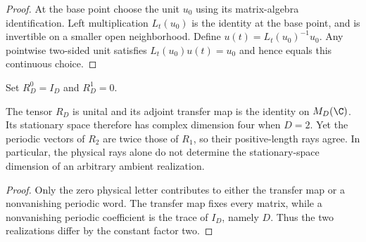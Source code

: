 \begin{proof}\leanok
    At the base point choose the unit $u_0$ using its matrix-algebra
    identification. Left multiplication $L_t(u_0)$ is the identity at
    the base point, and is invertible on a smaller open neighborhood.
    Define $u(t)=L_t(u_0)^{-1}u_0$. Any pointwise two-sided unit satisfies
    $L_t(u_0)u(t)=u_0$ and hence equals this continuous choice.
\end{proof}

\begin{definition}
    \label{def:spt_repeated_product_tensor}
    \leanok
    Set $R_D^0=I_D$ and $R_D^1=0$.
\end{definition}

\begin{lemma}
    \label{thm:spt_redundant_bond_stationary_space}
    \leanok
    The tensor $R_D$ is unital and its adjoint transfer map is the
    identity on $M_D(\C)$. Its stationary space therefore has complex
    dimension four when $D=2$. Yet the periodic vectors of $R_2$ are
    twice those of $R_1$, so their positive-length rays agree.
    In particular, the physical rays alone do not determine the
    stationary-space dimension of an arbitrary ambient realization.
\end{lemma}

\begin{proof}\leanok
    Only the zero physical letter contributes to either the transfer map
    or a nonvanishing periodic word. The transfer map fixes every matrix,
    while a nonvanishing periodic coefficient is the trace of $I_D$, namely
    $D$. Thus the two realizations differ by the constant factor two.
\end{proof}

